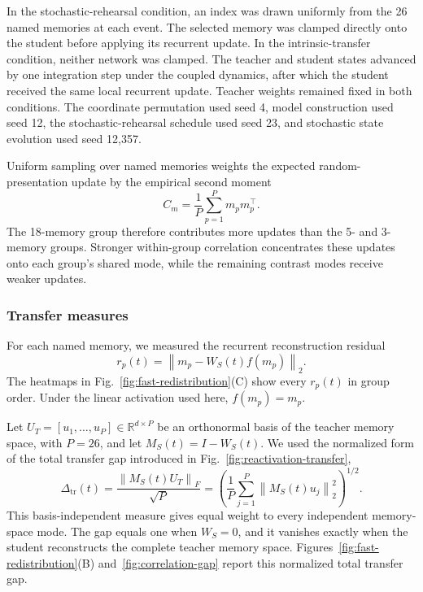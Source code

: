 \documentclass[10pt,letterpaper]{article}
\theoremstyle{plain}
\theoremstyle{remark}
\begin{document}
In the stochastic-rehearsal condition, an index was drawn uniformly from the 26 named memories at each event. The selected memory was clamped directly onto the student before applying its recurrent update. In the intrinsic-transfer condition, neither network was clamped. The teacher and student states advanced by one integration step under the coupled dynamics, after which the student received the same local recurrent update. Teacher weights remained fixed in both conditions. The coordinate permutation used seed 4, model construction used seed 12, the stochastic-rehearsal schedule used seed 23, and stochastic state evolution used seed 12,357.

Uniform sampling over named memories weights the expected random-presentation update by the empirical second moment
\begin{equation}
C_m=\frac{1}{P}\sum_{p=1}^{P}m_pm_p^\top.
\label{eq:random-memory-second-moment}
\end{equation}
The 18-memory group therefore contributes more updates than the 5- and 3-memory groups. Stronger within-group correlation concentrates these updates onto each group's shared mode, while the remaining contrast modes receive weaker updates.

\subsubsection{Transfer measures}

For each named memory, we measured the recurrent reconstruction residual
\begin{equation}
r_p(t)=\left\lVert m_p-W_S(t)f(m_p)\right\rVert_2.
\label{eq:named-memory-residual}
\end{equation}
The heatmaps in Fig.~\ref{fig:fast-redistribution}(C) show every $r_p(t)$ in group order. Under the linear activation used here, $f(m_p)=m_p$. 

Let $U_T=[u_1,\ldots,u_P]\in\mathbb R^{d\times P}$ be an orthonormal basis of the teacher memory space, with $P=26$, and let $M_S(t)=I-W_S(t)$. We used the normalized form of the total transfer gap introduced in Fig.~\ref{fig:reactivation-transfer},
\begin{equation}
\Delta_{\mathrm{tr}}(t)
=\frac{\left\lVert M_S(t)U_T\right\rVert_F}{\sqrt P}
=\left(\frac{1}{P}\sum_{j=1}^{P}\left\lVert M_S(t)u_j\right\rVert_2^2\right)^{1/2}.
\label{eq:normalized-total-transfer-gap}
\end{equation}
This basis-independent measure gives equal weight to every independent memory-space mode. The gap equals one when $W_S=0$, and it vanishes exactly when the student reconstructs the complete teacher memory space. Figures~\ref{fig:fast-redistribution}(B) and~\ref{fig:correlation-gap} report this normalized total transfer gap.
\end{document}
